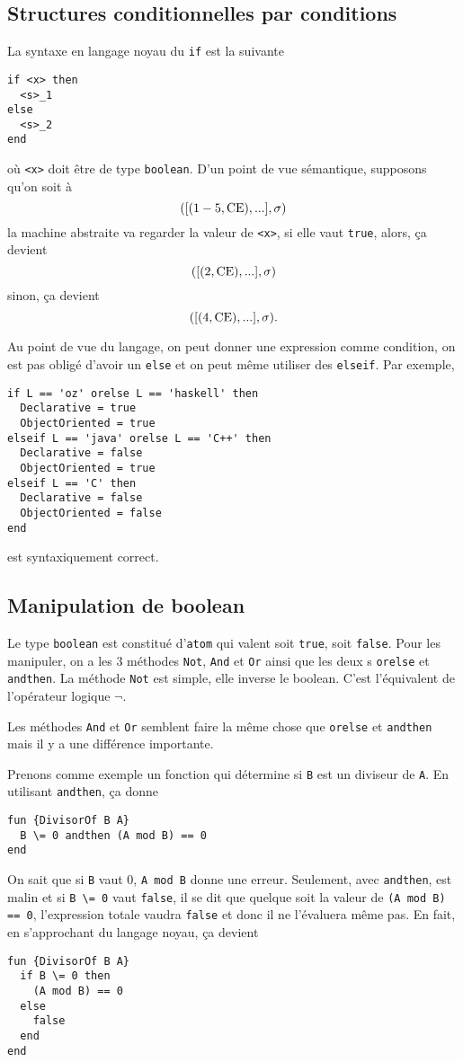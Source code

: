 \subsection{Structures conditionnelles par conditions}
\label{sec:if}
La syntaxe en langage noyau du \lstinline|if| est la
suivante
\begin{lstlisting}
if <x> then
  <s>_1
else
  <s>_2
end
\end{lstlisting}
où \lstinline|<x>| doit être de type \lstinline|boolean|.
D'un point de vue sémantique, supposons qu'on soit à
\[ ([(1-5,\mathrm{CE}),...], \sigma) \]
la machine abstraite va regarder la valeur de \lstinline|<x>|,
si elle vaut \lstinline|true|, alors, ça devient
\[ ([(2,\mathrm{CE}),...], \sigma) \]
sinon, ça devient
\[ ([(4,\mathrm{CE}),...], \sigma). \]

Au point de vue du langage,
on peut donner une expression comme condition,
on est pas obligé d'avoir un \lstinline|else|
et on peut même utiliser des \lstinline|elseif|.
Par exemple,
\begin{lstlisting}
if L == 'oz' orelse L == 'haskell' then
  Declarative = true
  ObjectOriented = true
elseif L == 'java' orelse L == 'C++' then
  Declarative = false
  ObjectOriented = true
elseif L == 'C' then
  Declarative = false
  ObjectOriented = false
end
\end{lstlisting}
est syntaxiquement correct.

\subsection{Manipulation de boolean}
Le type \lstinline|boolean| est constitué d'\lstinline|atom| qui valent
soit \lstinline|true|, soit \lstinline|false|.
Pour les manipuler, on a les 3 méthodes
\lstinline|Not|, \lstinline|And| et \lstinline|Or| ainsi que les deux
\keyword s \lstinline|orelse| et \lstinline|andthen|.
La méthode \lstinline|Not| est simple, elle inverse le boolean.
C'est l'équivalent de l'opérateur logique $\lnot$.

Les méthodes \lstinline|And| et \lstinline|Or| semblent faire
la même chose que \lstinline|orelse| et \lstinline|andthen| mais il y a
une différence importante.

Prenons comme exemple un fonction qui détermine
si \lstinline|B| est un diviseur de \lstinline|A|.
En utilisant \lstinline|andthen|, ça donne
\begin{lstlisting}
fun {DivisorOf B A}
  B \= 0 andthen (A mod B) == 0
end
\end{lstlisting}
On sait que si \lstinline|B| vaut 0,
\lstinline|A mod B| donne une erreur.
Seulement, avec \lstinline|andthen|,
\oz{} est malin et si \lstinline|B \= 0| vaut \lstinline|false|,
il se dit que quelque soit la valeur de \lstinline|(A mod B) == 0|,
l'expression totale vaudra \lstinline|false| et donc il ne l'évaluera
même pas.
En fait, en s'approchant du langage noyau, ça devient
\begin{lstlisting}
fun {DivisorOf B A}
  if B \= 0 then
    (A mod B) == 0
  else
    false
  end
end
\end{lstlisting}

